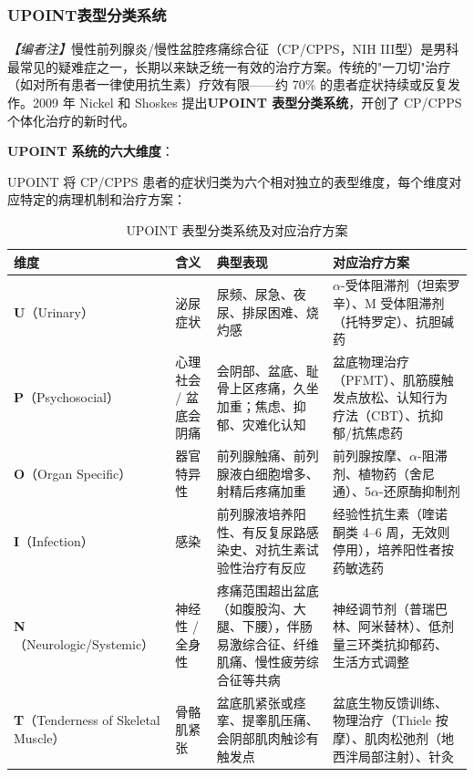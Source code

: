 \subsubsection{UPOINT表型分类系统}
\label{subsec:upoint}

\noindent\textit{【编者注】}慢性前列腺炎/慢性盆腔疼痛综合征（CP/CPPS，NIH III型）是男科最常见的疑难症之一，长期以来缺乏统一有效的治疗方案。传统的"一刀切"治疗（如对所有患者一律使用抗生素）疗效有限——约 70\% 的患者症状持续或反复发作。2009 年 Nickel 和 Shoskes 提出\textbf{UPOINT 表型分类系统}，开创了 CP/CPPS 个体化治疗的新时代。

\vspace{0.5em}
\noindent\textbf{UPOINT 系统的六大维度}：

UPOINT 将 CP/CPPS 患者的症状归类为六个相对独立的表型维度，每个维度对应特定的病理机制和治疗方案：

\begin{table}[htbp]
\centering
\caption{UPOINT 表型分类系统及对应治疗方案}
\label{tab:upoint}
\begin{tabularx}{\textwidth}{@{}llXX@{}}
    \toprule
    \textbf{维度} & \textbf{含义} & \textbf{典型表现} & \textbf{对应治疗方案} \\
    \midrule
    \textbf{U}（Urinary） & 泌尿症状 & 尿频、尿急、夜尿、排尿困难、烧灼感 & $\alpha$-受体阻滞剂（坦索罗辛）、M 受体阻滞剂（托特罗定）、抗胆碱药 \\
    \textbf{P}（Psychosocial） & 心理社会 / 盆底会阴痛 & 会阴部、盆底、耻骨上区疼痛，久坐加重；焦虑、抑郁、灾难化认知 & 盆底物理治疗（PFMT）、肌筋膜触发点放松、认知行为疗法（CBT）、抗抑郁/抗焦虑药 \\
    \textbf{O}（Organ Specific） & 器官特异性 & 前列腺触痛、前列腺液白细胞增多、射精后疼痛加重 & 前列腺按摩、$\alpha$-阻滞剂、植物药（舍尼通）、5$\alpha$-还原酶抑制剂 \\
    \textbf{I}（Infection） & 感染 & 前列腺液培养阳性、有反复尿路感染史、对抗生素试验性治疗有反应 & 经验性抗生素（喹诺酮类 4--6 周，无效则停用），培养阳性者按药敏选药 \\
    \textbf{N}（Neurologic/Systemic） & 神经性 / 全身性 & 疼痛范围超出盆底（如腹股沟、大腿、下腰），伴肠易激综合征、纤维肌痛、慢性疲劳综合征等共病 & 神经调节剂（普瑞巴林、阿米替林）、低剂量三环类抗抑郁药、生活方式调整 \\
    \textbf{T}（Tenderness of Skeletal Muscle） & 骨骼肌紧张 & 盆底肌紧张或痉挛、提睾肌压痛、会阴部肌肉触诊有触发点 & 盆底生物反馈训练、物理治疗（Thiele 按摩）、肌肉松弛剂（地西泮局部注射）、针灸 \\
    \bottomrule
\end{tabularx}
\end{table}

